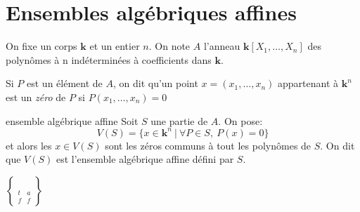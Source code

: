 \newcommand{\korps}{\textbf{k}}

\section{Ensembles algébriques affines}

On fixe un corps $\korps$ et un entier $n$. 
On note $A$ l'anneau $\korps[X_1, \dots, X_n]$ des polynômes à n indéterminées à coefficients dans $\korps$.

Si $P$ est un élément de $A$, on dit qu'un point $x = (x_1, \dots, x_n)$ 
appartenant à $\korps^n$ est un \textit{zéro} de $P$ si $P(x_1, \dots, x_n) = 0$

\begin{definition}{ensemble algébrique affine}{}
    Soit $S$ une partie de $A$. On pose:
    \[V(S) = \{x \in \korps^n ~ | ~ \forall P \in S, ~ P(x) = 0\}\]
    et alors les $x \in V(S)$ sont les zéros communs à tout les polynômes de $S$.
    On dit que $V(S)$ est l'ensemble algébrique affine défini par $S$.
\end{definition}

$
\brace
\begin{matrix}
    t & a \\
    f & f
\end{matrix} 
$